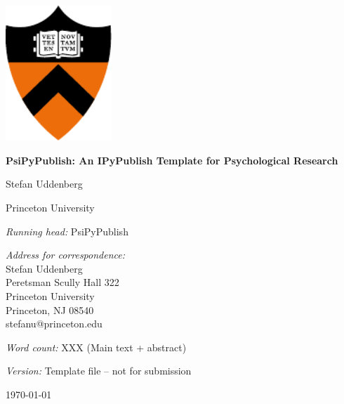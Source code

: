 \documentclass[10pt,parskip=half,
	toc=sectionentrywithdots,
	bibliography=totocnumbered,
	captions=tableheading,
    numbers=noendperiod,
    headings=standardclasses]{scrartcl}
\begin{document}
		\begin{titlepage}
	\begin{center}
		\includegraphics[width=0.3\textwidth]{template_files/princeton_logo.pdf}
	\end{center}

	\begin{center}

	\vspace*{1cm}

	\Huge\textbf{PsiPyPublish: An IPyPublish Template for Psychological Research}

	\vspace{0.8cm}

	\begin{center}\LARGE{Stefan Uddenberg}
	\end{center}
		  \LARGE{Princeton University}\\

	\begin{flushleft} \large\vspace{1.2cm}
		\emph{Running head:} PsiPyPublish
	\end{flushleft}

	\begin{flushleft} \large\emph{Address for correspondence:} \\
			Stefan Uddenberg\\
			Peretsman Scully Hall 322\\
			Princeton University\\
			Princeton, NJ 08540\\
			stefanu@princeton.edu\\
	\end{flushleft}

	\begin{flushleft} \large\emph{Word count:} XXX (Main text + abstract)
	\end{flushleft}

	\begin{flushleft} \large\emph{Version:} Template file -- not for submission
	\end{flushleft}

	\vfill

	\begin{minipage}{0.8\textwidth}
	\begin{center}
	\end{center}
	\end{minipage}

	\today

	\end{center}
	\end{titlepage}
\end{document}
